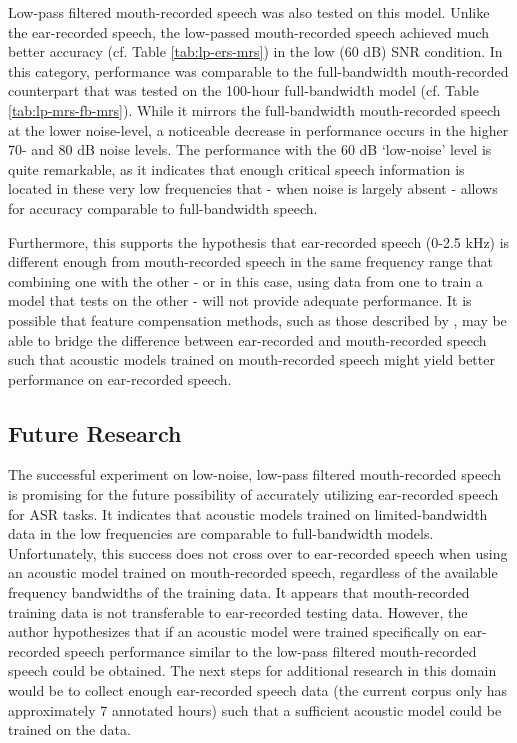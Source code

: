 Low-pass filtered mouth-recorded speech was also tested on this model.  Unlike the ear-recorded speech, the low-passed mouth-recorded speech achieved much better accuracy (cf. Table \ref{tab:lp-ers-mrs}) in the low (60 dB) SNR condition.  In this category, performance was comparable to the full-bandwidth mouth-recorded counterpart that was tested on the 100-hour full-bandwidth model (cf. Table \ref{tab:lp-mrs-fb-mrs}). While it mirrors the full-bandwidth mouth-recorded speech at the lower noise-level, a noticeable decrease in performance occurs in the higher 70- and 80 dB noise levels.  The performance with the 60 dB `low-noise' level is quite remarkable, as it indicates that enough critical speech information is located in these very low frequencies that - when noise is largely absent - allows for accuracy comparable to full-bandwidth speech.  

Furthermore, this supports the hypothesis that ear-recorded speech (0-2.5 kHz) is different enough from mouth-recorded speech in the same frequency range that combining one with the other - or in this case, using data from one to train a model that tests on the other - will not provide adequate performance.  It is possible that feature compensation methods, such as those described by \cite{morales:09}, may be able to bridge the difference between ear-recorded and mouth-recorded speech such that acoustic models trained on mouth-recorded speech might yield better performance on ear-recorded speech.


\subsection{Future Research}
\label{chap4:future-research}

The successful experiment on low-noise, low-pass filtered mouth-recorded speech is promising for the future possibility of accurately utilizing ear-recorded speech for ASR tasks.  It indicates that acoustic models trained on limited-bandwidth data in the low frequencies are comparable to full-bandwidth models.  Unfortunately, this success does not cross over to ear-recorded speech when using an acoustic model trained on mouth-recorded speech, regardless of the available frequency bandwidths of the training data. It appears that mouth-recorded training data is not transferable to ear-recorded testing data.  However, the author hypothesizes that if an acoustic model were trained specifically on ear-recorded speech performance similar to the low-pass filtered mouth-recorded speech could be obtained.  The next steps for additional research in this domain would be to collect enough ear-recorded speech data (the current corpus only has approximately 7 annotated hours) such that a sufficient acoustic model could be trained on the data.

